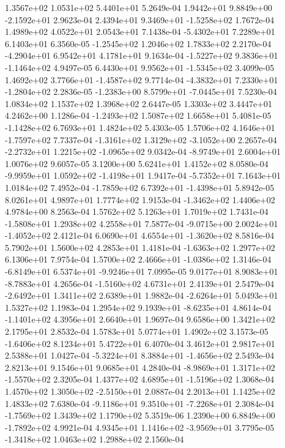 1.3567e+02 1.0531e+02 5.4401e+01  5.2649e-04
 1.9442e+01  9.8849e+00 -2.1592e+01  2.9623e-04
 2.4394e+01  9.3469e+01 -1.5258e+02  1.7672e-04
1.4989e+02 4.0522e+01 2.0543e+01  7.1438e-04
-5.4302e+01  7.2289e+01  6.1403e+01  6.3560e-05
-1.2545e+02  1.2046e+02  1.7833e+02  2.2170e-04
-4.2904e+01  6.9542e+01  4.1781e+01  9.1634e-04
-1.5227e+02  9.3836e+01 -1.1464e+02  4.9497e-05
 6.4430e+01  9.9562e+01 -1.5345e+02  3.4099e-05
 1.4692e+02  3.7766e+01 -1.4587e+02  9.7714e-04
-4.3832e+01  7.2330e+01 -1.2804e+02  2.2836e-05
-1.2383e+00  8.5799e+01 -7.0445e+01  7.5230e-04
1.0834e+02 1.1537e+02 1.3968e+02  2.6447e-05
1.3303e+02 3.4447e+01 4.2462e+00  1.1286e-04
-1.2493e+02  1.5087e+02  1.6658e+01  5.4081e-05
-1.1428e+02  6.7693e+01  1.4824e+02  5.4303e-05
 1.5706e+02  4.1646e+01 -1.7597e+02  7.7337e-04
-1.3161e+02  1.3129e+02 -3.1052e+00  2.2657e-04
-2.2732e+01  1.2215e+02 -1.0965e+02  9.0342e-04
-8.9749e+01  2.6004e+01  1.0076e+02  9.6057e-05
3.1200e+00 5.6241e+01 1.4152e+02  8.0580e-04
-9.9959e+01  1.0592e+02 -1.4198e+01  1.9417e-04
-5.7352e+01  7.1643e+01  1.0184e+02  7.4952e-04
-1.7859e+02  6.7392e+01 -1.4398e+01  5.8942e-05
8.0261e+01 4.9897e+01 1.7774e+02  1.9153e-04
-1.3462e+02  1.4406e+02  4.9784e+00  8.2563e-04
1.5762e+02 5.1263e+01 1.7019e+02  1.7431e-04
-1.5808e+01  1.2938e+02  4.2558e+01  7.5877e-04
-9.0715e+00  2.0024e+01 -1.4052e+02  2.4121e-04
 6.0690e+01  4.6554e+01 -1.3620e+02  8.5816e-04
5.7902e+01 1.5600e+02 4.2853e+01  1.4181e-04
-1.6363e+02  1.2977e+02  6.1306e+01  7.9754e-04
 1.5700e+02  2.4666e+01 -1.0386e+02  1.3146e-04
-6.8149e+01  6.5374e+01 -9.9246e+01  7.0995e-05
 9.0177e+01  8.9083e+01 -8.7883e+01  4.2656e-04
-1.5160e+02  4.6731e+01  2.4139e+01  2.5479e-04
-2.6492e+01  1.3411e+02  2.6389e+01  1.9882e-04
-2.6264e+01  5.0493e+01  1.5327e+02  1.1983e-04
 1.2954e+02  9.1939e+01 -8.6235e+01  4.8614e-04
-1.1401e+02  4.3956e+01  2.6640e+01  1.9697e-04
9.6586e+00 1.3421e+02 2.1795e+01  2.8532e-04
1.5783e+01 5.0774e+01 1.4902e+02  3.1573e-05
-1.6406e+02  8.1234e+01  5.4722e+01  6.4070e-04
3.4612e+01 2.9817e+01 2.5388e+01  1.0427e-04
-5.3224e+01  8.3884e+01 -1.4656e+02  2.5493e-04
2.8213e+01 9.1546e+01 9.0685e+01  4.2840e-04
-8.9869e+01  1.3171e+02 -1.5570e+02  2.3205e-04
 1.4377e+02  4.6895e+01 -1.5196e+02  1.3068e-04
 1.4570e+02  1.3050e+02 -2.5150e+01  2.0887e-04
2.2013e+01 1.1425e+02 1.4833e+02  7.6380e-04
-9.1186e+01  9.3510e+01 -7.2268e+01  2.3084e-04
-1.7569e+02  1.3439e+02  1.1790e+02  5.3519e-06
 1.2390e+00  6.8849e+00 -1.7892e+02  4.9921e-04
 4.9345e+01  1.1416e+02 -3.9569e+01  3.7795e-05
-1.3418e+02  1.0463e+02  1.2988e+02  2.1560e-04
